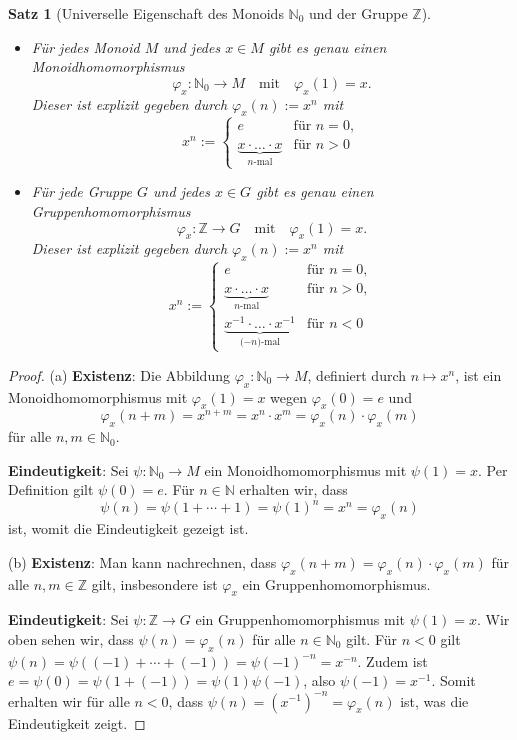\documentclass[a4paper, twoside, 11pt, ngerman]{report}
\newcommand{\NN}{\mathds N}
\theoremstyle{definistyle}
\newtheorem{satz}{Satz}[section]
\theoremstyle{remark}
\begin{document}
\begin{satz}[Universelle Eigenschaft des Monoids $\mathbb{N}_0$ und der Gruppe $\mathbb{Z}$]\label{satz:universelle_eigenschaft_z}
\begin{itemize}
    \item[(a)] Für jedes Monoid $M$ und jedes $x \in M$ gibt es genau einen Monoidhomomorphismus 
    \[
    \varphi_x: \mathbb{N}_0 \to M \quad \text{mit} \quad \varphi_x(1) = x.
    \]
    Dieser ist explizit gegeben durch $\varphi_x(n) := x^n$ mit
    \[
    x^n := 
    \begin{cases} 
      e & \text{für } n = 0, \\[10pt]
      \underbrace{x \cdot \ldots \cdot x}_{\text{$n$-mal}} & \text{für } n > 0 
    \end{cases}
    \]
    
    \item[(b)] Für jede Gruppe $G$ und jedes $x \in G$ gibt es genau einen Gruppenhomomorphismus 
    \[
    \varphi_x: \mathbb{Z} \to G \quad \text{mit} \quad \varphi_x(1) = x.
    \]
    Dieser ist explizit gegeben durch $\varphi_x(n) := x^n$ mit
    \[
    x^n := 
    \begin{cases} 
      e & \text{für } n = 0, \\[10pt]
      \underbrace{x \cdot \ldots \cdot x}_{\text{$n$-mal}} & \text{für } n > 0, \\[10pt]
      \underbrace{x^{-1} \cdot \ldots \cdot x^{-1}}_{\text{($-n$)-mal}} & \text{für } n < 0 
    \end{cases}
    \]
\end{itemize}
\end{satz}




\begin{proof}
(a) \textbf{Existenz}: Die Abbildung $\varphi_x: \mathbb{N}_0 \to M$, definiert durch $n \mapsto x^n$, ist ein Monoidhomomorphismus mit $\varphi_x(1) = x$ wegen $\varphi_x(0)=e$ und
\[\varphi_x(n + m) = x^{n+m} = x^n \cdot x^m = \varphi_x(n) \cdot \varphi_x(m)\]
für alle $n, m \in \mathbb{N}_0$.

\textbf{Eindeutigkeit}: Sei $\psi: \mathbb{N}_0 \to M$ ein Monoidhomomorphismus mit $\psi(1) = x$. Per Definition gilt $\psi(0) = e$. Für $n \in \mathbb{N}$ erhalten wir, dass \[\psi(n) = \psi(1 + \cdots + 1) = \psi(1)^n = x^n = \varphi_x(n)\] ist, womit die Eindeutigkeit gezeigt ist.

(b) \textbf{Existenz}: Man kann nachrechnen, dass  $\varphi_x(n + m) = \varphi_x(n) \cdot \varphi_x(m)$ für alle $n, m \in \mathbb{Z}$ gilt, insbesondere ist $\varphi_x$ ein Gruppenhomomorphismus.

\textbf{Eindeutigkeit}: Sei $\psi: \mathbb{Z} \to G$ ein Gruppenhomomorphismus mit $\psi(1) = x$. Wir oben sehen wir, dass $\psi(n)=\varphi_x(n)$ für alle $n\in\NN_0$ gilt. Für $n < 0$ gilt $\psi(n) = \psi((-1) + \cdots + (-1)) = \psi(-1)^{-n} = x^{-n}$. Zudem ist $e = \psi(0) = \psi(1 + (-1)) = \psi(1) \psi(-1)$, also $\psi(-1) = x^{-1}$. Somit erhalten wir für alle $n < 0$, dass $\psi(n) = (x^{-1})^{-n} = \varphi_x(n)$ ist, was die Eindeutigkeit zeigt.

\end{proof}
\end{document}
